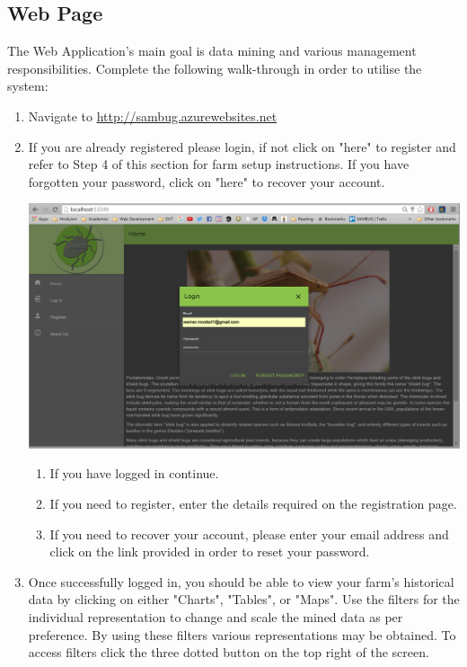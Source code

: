 \documentclass[11pt,a4paper,titlepage]{article}
\begin{document}
\subsection{Web Page}
		 The Web Application's main goal is data mining and various management responsibilities. Complete the following walk-through in order to utilise the system:
	\begin{enumerate}
		\item Navigate to \url{http://sambug.azurewebsites.net}
		\item If you are already registered please login, if not click on "here" to register and refer to Step 4 of this section for farm setup instructions. If you have forgotten your password, click on "here" to recover your account.  %
	\begin{center}
		\includegraphics[width=\linewidth]{login_page.png}
	\end{center}
		\begin{enumerate}
			\item If you have logged in continue.
			\item If you need to register, enter the details required on the registration page.
			\item If you need to recover your account, please enter your email address and click on the link provided in order to reset your password.
		\end{enumerate}
\item Once successfully logged in, you should be able to view your farm's historical data by clicking on either "Charts", "Tables", or "Maps". Use the filters for the individual representation to change and scale the mined data as per preference. By using these filters various representations may be obtained. To access filters click the three dotted button on the top right of the screen.

\end{enumerate}
\end{document}
